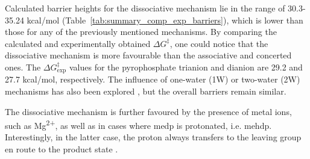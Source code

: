 Calculated barrier heights for the dissociative mechanism lie in the range of 30.3-35.24 kcal/mol (Table~\ref{tab:summary_comp_exp_barriers}), which is lower than those for any of the previously mentioned mechanisms. By comparing the calculated and experimentally obtained $\Delta G^{\ddagger}$, one could notice that the dissociative mechanism is more favourable than the associative and concerted ones. The $\Delta G^{\ddagger}_{\text{exp}}$ values for the pyrophosphate trianion and dianion are 29.2 and 27.7 kcal/mol, respectively. The influence of one-water (1W) or two-water (2W) mechanisms has also been explored \citep{prasadAddressingOpenQuestions2013}, but the overall barriers remain similar.

The dissociative mechanism is further favoured by the presence of metal ions, such as Mg\textsuperscript{2+}, as well as in cases where \ac{medp} is protonated, i.e. \ac{mehdp}. Interestingly, in the latter case, the proton always transfers to the leaving group en route to the product state \citep{klahnMechanismHydrolysisPhosphate2006}.

